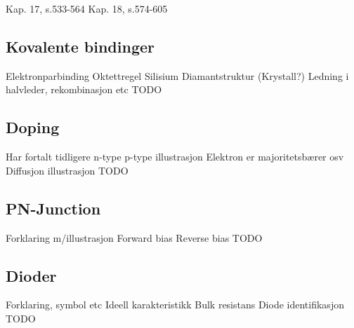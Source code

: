 Kap. 17, s.533-564
Kap. 18, s.574-605

\subsection{Kovalente bindinger}
Elektronparbinding Oktettregel
Silisium Diamantstruktur (Krystall?)
Ledning i halvleder, rekombinasjon etc
TODO

\subsection{Doping}
Har fortalt tidligere
n-type p-type illustrasjon
Elektron er majoritetsbærer osv
Diffusjon illustrasjon
TODO

\subsection{PN-Junction}
Forklaring m/illustrasjon
Forward bias
Reverse bias
TODO

\subsection{Dioder}
Forklaring, symbol etc
Ideell karakteristikk
Bulk resistans
Diode identifikasjon
TODO
